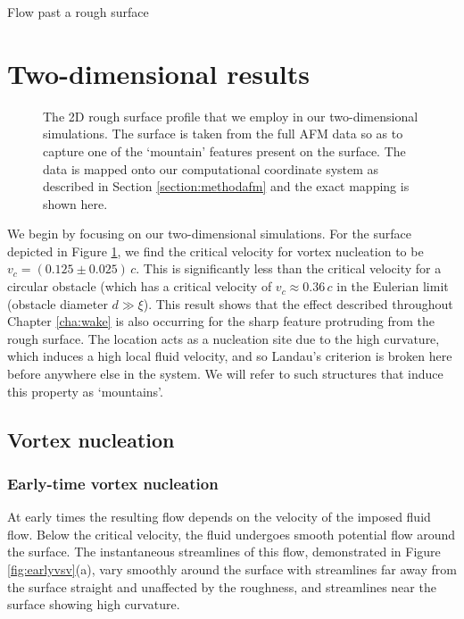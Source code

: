 \begin{chapter}{\label{cha:afm}Flow past a rough surface}
\section{Two-dimensional results}
\begin{figure}
  \centering
  \caption{\label{fig:surfprofile} The 2D rough surface profile that we employ in our two-dimensional simulations. The surface is taken from the full AFM data so as to capture one of the `mountain' features present on the surface. The data is mapped onto our computational coordinate system as described in Section \ref{section:methodafm} and the exact mapping is shown here.}
\end{figure}

We begin by focusing on our two-dimensional simulations. For the surface depicted in Figure \ref{fig:surfprofile}, we find the critical velocity for vortex nucleation to be $v_c=(0.125\pm0.025)\,c$. This is significantly less than the critical velocity for a circular obstacle (which has a critical velocity of $v_c\approx 0.36\,c$ \cite{win00,stagg_parker_14,stagg_2015b} in the Eulerian limit (obstacle diameter $d \gg \xi$). This result shows that the effect described throughout Chapter \ref{cha:wake} is also occurring for the sharp feature protruding from the rough surface. The location acts as a nucleation site due to the high curvature, which induces a high local fluid velocity, and so Landau's criterion is broken here before anywhere else in the system. We will refer to such structures that induce this property as `mountains'.

\subsection{Vortex nucleation}
\subsubsection{Early-time vortex nucleation}
At early times the resulting flow depends on the velocity of the imposed fluid flow. Below the critical velocity, the fluid undergoes smooth potential flow around the surface. The instantaneous streamlines of this flow, demonstrated in Figure \ref{fig:earlyvsv}(a), vary smoothly around the surface with streamlines far away from the surface straight and unaffected by the roughness, and streamlines near the surface showing high curvature.


\end{chapter}
